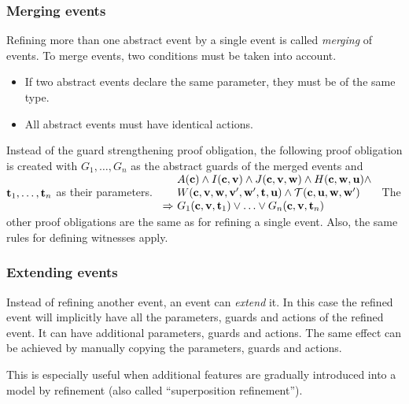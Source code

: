 \subsubsection{Merging events}
\label{merging_events}
Refining more than one abstract event by a single event is called \emph{merging} of events.
To merge events, two conditions must be taken into account.
\begin{itemize}
\item If two abstract events declare the same parameter, they must be of the same type.
\item All abstract events must have identical actions.
\end{itemize}
Instead of the guard strengthening proof obligation, the following proof obligation is
created with $G_1,\ldots,G_n$ as the abstract guards of the merged events
  and $\mathbf{t}_1,\ldots,\mathbf{t}_n$ as their parameters.
%
  {$\begin{array}{l@{\ }l}
      & \axioms \land \absinvariants \land \concinvariants \land
      \concguards \land \\
      & \witnesspred \land \bapred \\
      \limp & G_1(\allconstants,\absvariables,\absparameters_1)\lor\ldots\lor G_n(\allconstants,\absvariables,\absparameters_n)      
    \end{array}
$}
The other proof obligations are the same as for refining a single event.
Also, the same rules for defining witnesses apply.

\subsubsection{Extending events}
\label{extending_events}
Instead of refining another event, an event can \emph{extend} it.
In this case the refined event will implicitly have all the parameters, 
 guards and actions of the refined event. It can have additional parameters,
 guards and actions. The same effect can be achieved by manually copying the parameters, guards and actions.

This is especially useful when additional features are gradually introduced
 into a model by refinement (also called ``superposition refinement'').

